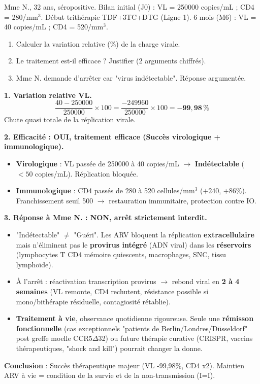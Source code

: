\documentclass[11pt]{article}
\begin{document}
\begin{exoresolu}
Mme N., 32 ans, séropositive. Bilan initial (J0) : VL = \num{250000} copies/mL ; CD4 = 280/mm$^3$. Début trithérapie TDF+3TC+DTG (Ligne 1). 6 mois (M6) : VL = \num{40} copies/mL ; CD4 = 520/mm$^3$.
\begin{enumerate}
\item Calculer la variation relative (\%) de la charge virale.
\item Le traitement est-il efficace ? Justifier (2 arguments chiffrés).
\item Mme N. demande d'arrêter car "virus indétectable". Réponse argumentée.
\end{enumerate}
\tcblower
\textbf{1. Variation relative VL.}
\[
\frac{40 - 250000}{250000} \times 100 = \frac{-249960}{250000} \times 100 = \mathbf{-99,98\,\%}
\]
Chute quasi totale de la réplication virale.

\textbf{2. Efficacité : OUI, traitement \textbf{efficace} (Succès virologique + immunologique).}
\begin{itemize}
\item \textbf{Virologique} : VL passée de \num{250000} à \num{40} copies/mL $\rightarrow$ \textbf{Indétectable} ($< 50$ copies/mL). Réplication bloquée.
\item \textbf{Immunologique} : CD4 passés de 280 à 520 cellules/mm$^3$ ($+240$, $+86\%$). Franchissement seuil 500 $\rightarrow$ restauration immunitaire, protection contre IO.
\end{itemize}

\textbf{3. Réponse à Mme N. : \textbf{NON, arrêt strictement interdit.}}
\begin{itemize}
\item "Indétectable" $\neq$ "Guéri". Les ARV bloquent la réplication \textbf{extracellulaire} mais n'éliminent pas le \textbf{provirus intégré} (ADN viral) dans les \textbf{réservoirs} (lymphocytes T CD4 mémoire quiescents, macrophages, SNC, tissu lymphoïde).
\item À l'arrêt : réactivation transcription provirus $\rightarrow$ rebond viral en \textbf{2 à 4 semaines} (VL remonte, CD4 rechutent, résistance possible si mono/bithérapie résiduelle, contagiosité rétablie).
\item \textbf{Traitement à vie}, observance quotidienne rigoureuse. Seule une \textbf{rémisson fonctionnelle} (cas exceptionnels "patients de Berlin/Londres/Düsseldorf" post greffe moelle CCR5$\Delta$32) ou future thérapie curative (CRISPR, vaccins thérapeutiques, "shock and kill") pourrait changer la donne.
\end{itemize}
\textbf{Conclusion} : Succès thérapeutique majeur (VL -99,98\%, CD4 x2). Maintien ARV à vie = condition de la survie et de la non-transmission (I=I).
\end{exoresolu}
\end{document}
